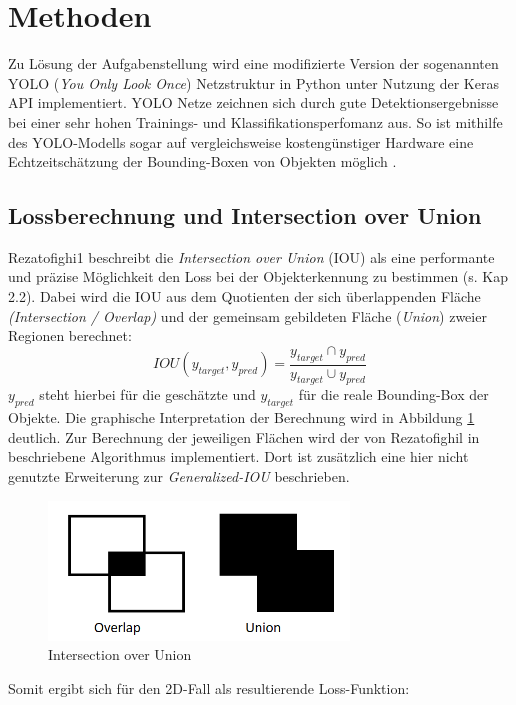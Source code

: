 \section{Methoden}

Zu Lösung der Aufgabenstellung wird eine modifizierte Version der sogenannten YOLO (\textit{You Only Look Once}) Netzstruktur in Python unter Nutzung der Keras API implementiert. YOLO Netze zeichnen sich durch gute Detektionsergebnisse bei einer sehr hohen Trainings- und Klassifikationsperfomanz aus. So ist mithilfe des YOLO-Modells sogar auf vergleichsweise kostengünstiger Hardware eine Echtzeitschätzung der Bounding-Boxen von Objekten möglich \cite{Redmon2016}. 

\subsection{Lossberechnung und Intersection over Union}
\label{Loss_ber}
Rezatofighi1 beschreibt die \textit{Intersection over Union} (IOU) als eine performante und präzise Möglichkeit den Loss bei der Objekterkennung zu bestimmen (s. Kap 2.2). Dabei wird die IOU aus dem Quotienten der sich überlappenden Fläche \textit{(Intersection / Overlap)} und der gemeinsam gebildeten Fläche (\textit{Union}) zweier Regionen berechnet: 
\begin{equation}\label{iou}
	IOU(y_{target},y_{pred})=\frac{y_{target} \cap y_{pred}}{y_{target} \cup y_{pred}}
\end{equation}
$y_{pred}$ steht hierbei für die geschätzte und $y_{target}$ für die reale Bounding-Box der Objekte. Die graphische Interpretation der Berechnung wird in Abbildung \ref{ioubild} deutlich. Zur Berechnung der jeweiligen Flächen wird der von Rezatofighil in \cite{Rezatofighi1902} beschriebene Algorithmus implementiert. Dort ist zusätzlich eine hier nicht genutzte Erweiterung zur \textit{Generalized-IOU} beschrieben.
\begin{figure}[!h]
  \centering
  \includegraphics[width=8cm]{iou.png}
  \caption{Intersection over Union}
  \label{ioubild}
\end{figure} 
\FloatBarrier
Somit ergibt sich für den 2D-Fall als resultierende Loss-Funktion:
